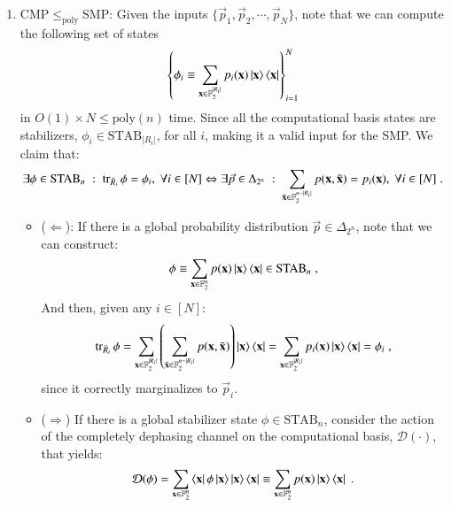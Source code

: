 \documentclass[10pt,aps,pra,twocolumn,floatfix,nofootinbib,superscriptaddress,longbibliography]{revtex4-2}
\newcommand{\1}{\mathbbm{1}}
\begin{document}
\begin{enumerate}
    \item $\mathrm{CMP} \leq_\mathrm{poly} \mathrm{SMP}$: Given the inputs $\{\vec{p}_1, \vec{p}_2, \cdots, \vec{p}_N\}$, note that we can compute the following set of states
    \begin{equation}
        \left\{\phi_i\equiv \sum_{\mathbf x \in\mathbb F_2^{|R_i|}}p_i(\mathbf x )\ket{\mathbf x }\bra{\mathbf x} \right\}_{i=1}^N
    \end{equation}
    in $O(1)\times N \leq \mathrm{poly}(n)$ time. Since all the computational basis states are stabilizers, $\phi_i \in \mathrm{STAB}_{|R_i|}$, for all $i$, making it a valid input for the SMP. We claim that:
    \begin{equation}
        \exists \phi \in \mathrm{STAB}_n\;:\;\tr_{\bar{R}_i}\phi = \phi_i, \;\forall i \in [N] \Leftrightarrow \exists \vec{p} \in \Delta_{2^n}\;:\; \sum_{\bar{\mathbf x} \in \mathbb F_2^{n-|R_i|}}p(\mathbf x, \bar{\mathbf x}) =p_i(\mathbf x), \;\forall i \in [N]\;.
    \end{equation}
    \begin{itemize}
        \item ($\Leftarrow$): If there is a global probability distribution $\vec{p} \in \Delta_{2^n}$, note that we can construct:
        \begin{equation}
            \phi \equiv \sum_{\mathbf x \in \mathbb F_2^n } p(\mathbf x) \ket{\mathbf x}\bra{\mathbf x} \in \mathrm{STAB}_n\;,
        \end{equation}
        And then, given any $i \in [N]$:
        \begin{equation}
            \tr_{\bar R_i}\phi = \sum_{\mathbf x \in \mathbb F_2^{|R_i|}} \left( \sum_{\bar{\mathbf x} \in \mathbb F_2^{n-|R_i|}}p(\mathbf x, \bar{\mathbf x})\right)\ket{\mathbf x }\bra{\mathbf x} =\sum_{\mathbf x \in\mathbb F_2^{|R_i|}}p_i(\mathbf x )\ket{\mathbf x }\bra{\mathbf x} = \phi_i\;,
        \end{equation}
        since it correctly marginalizes to $\vec{p}_i$.
        \item ($\Rightarrow$) If there is a global stabilizer state $\phi \in \mathrm{STAB}_n$, consider the action of the completely dephasing channel on the computational basis, $\mathcal D(\cdot)$, that yields:
        \begin{equation}
            \mathcal D(\phi)=\sum_{\mathbf x \in \mathbb F_2^n}\bra{\mathbf x}\phi \ket{\mathbf x} \ket{\mathbf x }\bra{\mathbf x} \equiv \sum_{\mathbf x \in \mathbb F_2^n}p(\mathbf x) \ket{\mathbf x }\bra{\mathbf x}\;.

\end{equation}
\end{itemize}
\end{enumerate}
\end{document}
